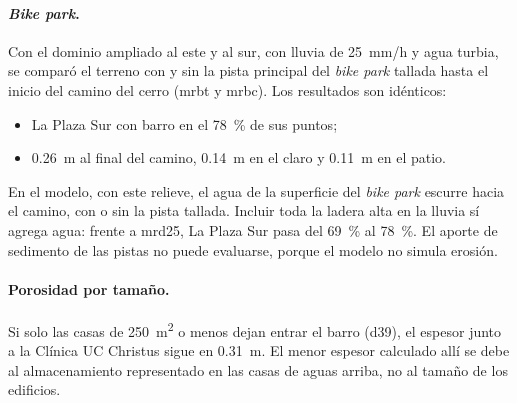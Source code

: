 \paragraph{\emph{Bike park}.} Con el dominio ampliado al este y al sur, con lluvia de \SI{25}{mm/h} y agua turbia, se comparó el terreno con y sin la pista principal del \emph{bike park} tallada hasta el inicio del camino del cerro (mrbt y mrbc). Los resultados son idénticos:
\begin{itemize}
\item La Plaza Sur con barro en el \SI{78}{\percent} de sus puntos;
\item \SI{0,26}{m} al final del camino, \SI{0,14}{m} en el claro y \SI{0,11}{m} en el patio.
\end{itemize}
En el modelo, con este relieve, el agua de la superficie del \emph{bike park} escurre hacia el camino, con o sin la pista tallada. Incluir toda la ladera alta en la lluvia sí agrega agua: frente a mrd25, La Plaza Sur pasa del \SI{69}{\percent} al \SI{78}{\percent}. El aporte de sedimento de las pistas no puede evaluarse, porque el modelo no simula erosión.

\paragraph{Porosidad por tamaño.} Si solo las casas de \SI{250}{m^2} o menos dejan entrar el barro (d39), el espesor junto a la Clínica UC Christus sigue en \SI{0,31}{m}. El menor espesor calculado allí se debe al almacenamiento representado en las casas de aguas arriba, no al tamaño de los edificios.

